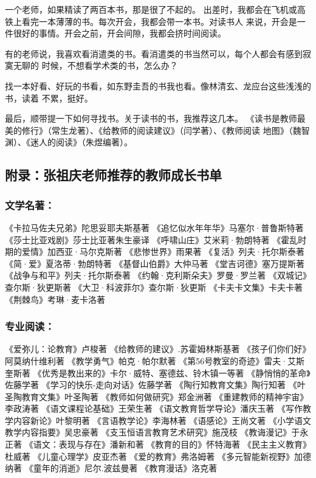 \documentclass[11pt]{ctexart}
\begin{document}
{{{{一个老师，如果精读了两百本书，那是很了不起的。
出差时，我都会在飞机或高铁上看完一本薄薄的书。每次开会，我都会带一本书。对读书人
来说，开会是一件很好的事情。开会之前，开会间隙，我都会挤时间阅读。

有的老师说，我喜欢看消遣类的书。看消遣类的书当然可以，每个人都会有感到寂寞无聊的
时候，不想看学术类的书，怎么办？

找一本好看、好玩的书看，如东野圭吾的书我也看。像林清玄、龙应台这些浅浅的书，读着
不累，挺好。

最后，顺带提一下如何寻找书。关于读书的书，我推荐这几本。
《读书是教师最美的修行》（常生龙著）、《给教师的阅读建议》（闫学著）、《教师阅读
地图》（魏智渊）、《迷人的阅读》（朱煜编著）。

\subsection{附录：张祖庆老师推荐的教师成长书单}
\label{sec:orgd296ae2}
\subsubsection{文学名著：}
\label{sec:org00cc149}
《卡拉马佐夫兄弟》陀思妥耶夫斯基著
《追忆似水年年华》马塞尔·普鲁斯特著
《莎士比亚戏剧》莎士比亚著朱生豪译
《呼啸山庄》艾米莉·勃朗特著
《霍乱时期的爱情》加西亚·马尔克斯著
《悲惨世界》雨果著
《复活》列夫·托尔斯泰著
《简·爱》夏洛蒂·勃朗特著
《基督山伯爵》大仲马著
《堂吉诃德》塞万提斯著
《战争与和平》列夫·托尔斯泰著
《约翰·克利斯朵夫》罗曼·罗兰著
《双城记》查尔斯·狄更斯著
《大卫·科波菲尔》查尔斯·狄更斯
《卡夫卡文集》卡夫卡著
《荆棘鸟》考琳·麦卡洛著
\subsubsection{专业阅读：}
\label{sec:org64e3e46}
《爱弥儿：论教育》卢梭著
《给教师的建议》.苏霍姆林斯基著
《孩子们你们好》阿莫纳什维利著
《教学勇气》帕克·帕尔默著
《第56号教室的奇迹》雷夫·艾斯奎斯著
《优秀是教出来的》卡尔·威特、塞德兹、铃木镇一等著
《静悄悄的革命》佐藤学著
《学习的快乐-走向对话》佐藤学著
《陶行知教育文集》陶行知著
《叶圣陶教育文集》叶圣陶著
《教师如何做研究》郑金洲著
《重建教师的精神宇宙》李政涛著
《语文课程论基础》王荣生著
《语文教育哲学导论》潘庆玉著
《写作教学内容新论》叶黎明著
《言语教学论》李海林著
《语感论》王尚文著
《小学语文教学内容指要》吴忠豪著
《支玉恒语言教育艺术研究》施茂枝
《教诲漫记》于永正著
《语文：表现与存在》潘新和著
《教育的目的》怀特海著
《民主主义教育》杜威著
《儿童心理学》皮亚杰著
《爱的教育》弗洛姆著
《多元智能新视野》加德纳著
《童年的消逝》尼尔.波兹曼著
《教育漫话》洛克著
}}}}
\end{document}
